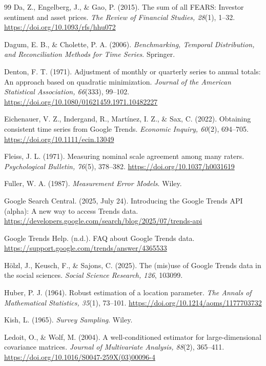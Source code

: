 \documentclass[12pt,a4paper,oneside]{article}
\begin{document}
\begin{thebibliography}{99}
Da, Z., Engelberg, J., \& Gao, P. (2015).
The sum of all FEARS: Investor sentiment and asset prices.
\textit{The Review of Financial Studies, 28}(1), 1--32.
\url{https://doi.org/10.1093/rfs/hhu072}

Dagum, E. B., \& Cholette, P. A. (2006).
\textit{Benchmarking, Temporal Distribution, and Reconciliation Methods for Time Series}.
Springer.

Denton, F. T. (1971).
Adjustment of monthly or quarterly series to annual totals: An approach based on quadratic minimization.
\textit{Journal of the American Statistical Association, 66}(333), 99--102.
\url{https://doi.org/10.1080/01621459.1971.10482227}

Eichenauer, V. Z., Indergand, R., Martínez, I. Z., \& Sax, C. (2022).
Obtaining consistent time series from Google Trends.
\textit{Economic Inquiry, 60}(2), 694--705.
\url{https://doi.org/10.1111/ecin.13049}

Fleiss, J. L. (1971).
Measuring nominal scale agreement among many raters.
\textit{Psychological Bulletin, 76}(5), 378--382.
\url{https://doi.org/10.1037/h0031619}

Fuller, W. A. (1987).
\textit{Measurement Error Models}.
Wiley.

Google Search Central. (2025, July 24).
Introducing the Google Trends API (alpha): A new way to access Trends data.
\url{https://developers.google.com/search/blog/2025/07/trends-api}

Google Trends Help. (n.d.).
FAQ about Google Trends data.
\url{https://support.google.com/trends/answer/4365533}

Hölzl, J., Keusch, F., \& Sajons, C. (2025).
The (mis)use of Google Trends data in the social sciences.
\textit{Social Science Research, 126}, 103099.

Huber, P. J. (1964).
Robust estimation of a location parameter.
\textit{The Annals of Mathematical Statistics, 35}(1), 73--101.
\url{https://doi.org/10.1214/aoms/1177703732}

Kish, L. (1965).
\textit{Survey Sampling}.
Wiley.

Ledoit, O., \& Wolf, M. (2004).
A well-conditioned estimator for large-dimensional covariance matrices.
\textit{Journal of Multivariate Analysis, 88}(2), 365--411.
\url{https://doi.org/10.1016/S0047-259X(03)00096-4}


\end{thebibliography}
\end{document}
